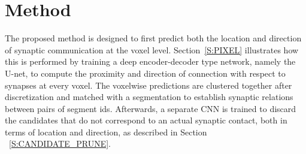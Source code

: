\documentclass{llncs}
\begin{document}
\section{Method}
The proposed method is designed to first predict both the location and direction of synaptic communication at the voxel level. Section~\ref{S:PIXEL} illustrates how this is performed by training a deep encoder-decoder type network, namely the U-net, to compute the proximity and direction of connection with respect to synapses at every voxel. The voxelwise predictions are clustered together after discretization and matched with a segmentation to establish synaptic relations between pairs of segment ids. Afterwards, a separate CNN is trained to discard the candidates that do not correspond to an actual synaptic contact, both in terms of location and direction, as described in Section ~\ref{S:CANDIDATE_PRUNE}.
\end{document}
